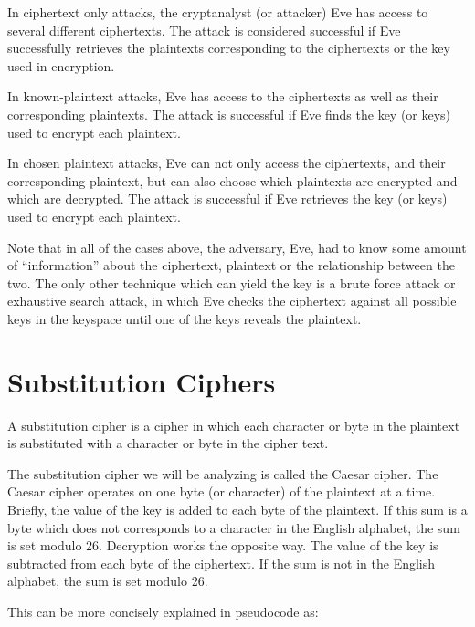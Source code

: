 \documentclass[12pt, a4paper, draft]{report}
\begin{document}
In ciphertext only attacks, the cryptanalyst (or attacker) Eve has access
to several different ciphertexts. The attack is considered successful if
Eve successfully retrieves the plaintexts corresponding to the ciphertexts
or the key used in encryption.

In known-plaintext attacks, Eve has access to the ciphertexts as well
as their corresponding plaintexts. The attack is successful if Eve
finds the key (or keys) used to encrypt each plaintext.

In chosen plaintext attacks, Eve can not only access the ciphertexts,
and their corresponding plaintext, but can also choose which plaintexts
are encrypted and which are decrypted. The attack is successful if Eve
retrieves the key (or keys) used to encrypt each plaintext.

Note that in all of the cases above, the adversary, Eve, had to know
some amount of ``information'' about the ciphertext, plaintext or the
relationship between the two. The only other technique which can yield
the key is a brute force attack or exhaustive search attack, in which
Eve checks the ciphertext against all possible keys in the keyspace until
one of the keys reveals the plaintext.


\section{Substitution Ciphers}


A substitution cipher is a cipher in which each character or byte in the
plaintext is substituted with a character or byte in the cipher text.

The substitution cipher we will be analyzing is called the Caesar cipher.
The Caesar cipher operates on one byte (or character) of the plaintext at
a time. Briefly, the value of the key is added to each byte of the
plaintext. If this sum is a byte which does not corresponds to a
character in the English alphabet, the sum is set modulo 26. Decryption
works the opposite way. The value of the key is subtracted from each byte
of the ciphertext. If the sum is not in the English alphabet, the sum
is set modulo 26.

This can be more concisely explained in pseudocode as:
\end{document}
